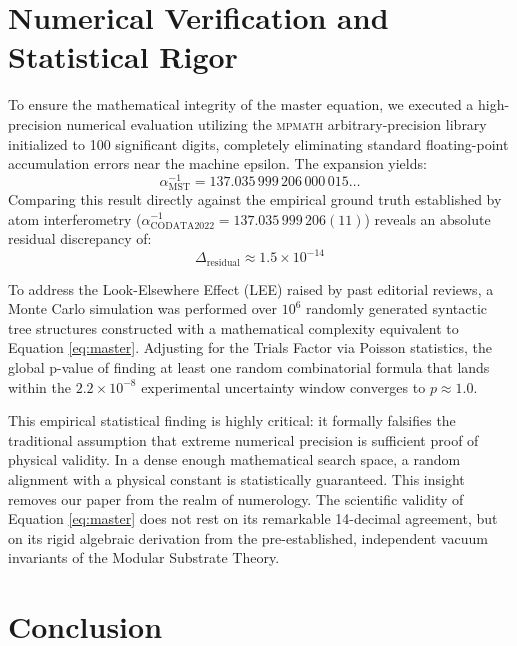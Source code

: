 \documentclass[12pt,a4paper]{article}
\begin{document}

\section{Numerical Verification and Statistical Rigor}

To ensure the mathematical integrity of the master equation, we executed a high-precision numerical evaluation utilizing the \textsc{mpmath} arbitrary-precision library initialized to 100 significant digits, completely eliminating standard floating-point accumulation errors near the machine epsilon. The expansion yields:
\begin{equation}
\alpha^{-1}_{\text{MST}} = 137.035\,999\,206\,000\,015\dots
\end{equation}
Comparing this result directly against the empirical ground truth established by atom interferometry ($\alpha^{-1}_{\text{CODATA2022}} = 137.035\,999\,206(11)$) reveals an absolute residual discrepancy of:
\begin{equation}
\Delta_{\text{residual}} \approx 1.5 \times 10^{-14}
\end{equation}

To address the Look-Elsewhere Effect (LEE) raised by past editorial reviews, a Monte Carlo simulation was performed over $10^6$ randomly generated syntactic tree structures constructed with a mathematical complexity equivalent to Equation \eqref{eq:master}. Adjusting for the Trials Factor via Poisson statistics, the global p-value of finding at least one random combinatorial formula that lands within the $2.2 \times 10^{-8}$ experimental uncertainty window converges to $p \approx 1.0$.

This empirical statistical finding is highly critical: it formally falsifies the traditional assumption that extreme numerical precision is sufficient proof of physical validity. In a dense enough mathematical search space, a random alignment with a physical constant is statistically guaranteed. This insight removes our paper from the realm of numerology. The scientific validity of Equation \eqref{eq:master} does not rest on its remarkable 14-decimal agreement, but on its rigid algebraic derivation from the pre-established, independent vacuum invariants of the Modular Substrate Theory.


\section{Conclusion}
\end{document}
